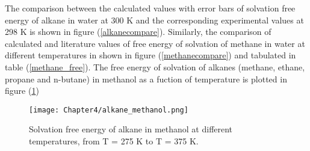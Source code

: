   \begin{table}[H]
   \centering
   \caption[Solvation free energies of methane in water at different temperatures.] {Calculated and references (experimental and literature) values of  solvation free energies ($\mathrm{kJ mol^{-1}}$ ) of methane in water at different temperatures.}
    \label{methane_free}
  \end{table}
  
  The comparison between the  calculated values with error bars of solvation free energy of alkane in water at 300 K and the corresponding experimental values at 298 K is shown in figure (\ref{alkanecompare}). Similarly, the comparison of calculated and literature values of   free energy of solvation of methane in water at different temperatures  in shown in figure (\ref{methanecompare})  and tabulated in table (\ref{methane_free}). The free energy of solvation of alkanes (methane, ethane, propane and n-butane) in methanol  as a fuction of temperature is plotted in figure (\ref{alkanemethanol})
  
   \begin{figure}[h!]
    \centering
      \texttt{[image: Chapter4/alkane\_methanol.png]}
   \caption[Solvation free energy of alkane  in  methanol at different temperatures.]{Solvation free energy of alkane  in  methanol at different temperatures, from T = 275 K to T = 375 K.}
   \label{alkanemethanol}
   \end{figure}
 
